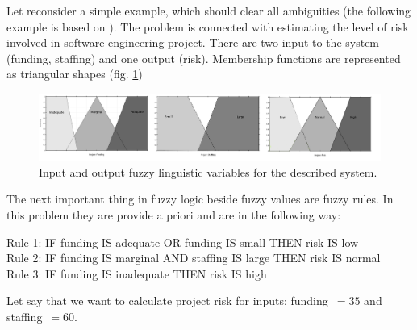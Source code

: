 Let reconsider a simple example, which should clear all ambiguities (the following 
example is based on \cite{bib0}). The problem is connected with estimating the
level of risk involved in software engineering project. There are two input
to the system (funding, staffing) and one output
(risk). Membership functions are represented as triangular shapes (fig. \ref{fig:fuzzy_example_1}) 
\begin{figure}[H]
    \begin{center}
        \includegraphics[width=\textwidth]{fig/fuzzy_example_1.png}
    \end{center}
    \caption{Input and output fuzzy linguistic variables for the described
    system.}
    \label{fig:fuzzy_example_1}
\end{figure}
The next important thing in fuzzy logic beside fuzzy values are fuzzy rules. In
this problem they are provide a priori and are in the following way:
\begin{table}[H]
    Rule 1: IF funding IS adequate OR funding IS small THEN risk IS
    low \\
    Rule 2: IF funding IS marginal AND staffing IS large THEN risk IS
    normal \\
    Rule 3: IF funding IS inadequate THEN risk IS high
\end{table}
Let say that we want to calculate project risk for inputs: funding~$=35$ and
staffing~$=60$. 
